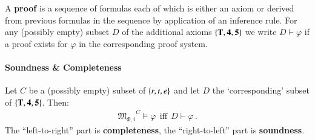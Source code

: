 \documentclass[nobib,nofonts]{tufte-handout}
\newcommand{\Props}{\ensuremath{\Phi}}
\renewcommand{\phi}{\ensuremath{\varphi}}
\newcommand{\Models}{\ensuremath{\mathfrak{M}_{\Props,i}}}
\begin{document}
\begin{definition}
  A \textbf{proof} is a sequence of formulas each of which is either
  an axiom or derived from previous formulas in the sequence by
  application of an inference rule. For any (possibly empty)
  subset $D$ of the additional axioms $\left\{\mathbf{T},
    \mathbf{4},\mathbf{5}\right\}$ we write $D \vdash \phi$ if a proof exists
  for $\phi$ in the corresponding proof system.
\end{definition}

\paragraph{Soundness \& Completeness}
\label{sec:soundn-compl}

\begin{theorem}
  Let $C$ be a (possibly empty) subset of $\left\{r,t,e\right\}$ and let $D$ the
  `corresponding' subset of $\left\{\mathbf{T},
    \mathbf{4},\mathbf{5}\right\}$. Then:
  \begin{align*}
    \Models^C \models \phi \ \ \text{iff} \ \ D \vdash \phi\,.
  \end{align*}
  The ``left-to-right'' part is \textbf{completeness}, the ``right-to-left''
  part is \textbf{soundness}.
\end{theorem}
\end{document}
